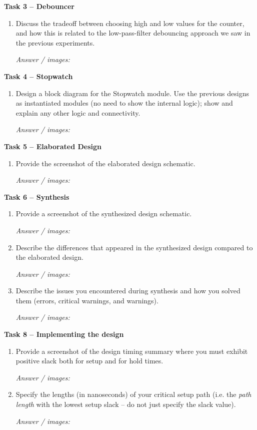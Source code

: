 \documentclass[11pt,a4paper]{article}
\newcommand{\answerspace}[1]{%
  \par\vspace{1mm}\noindent\textit{Answer / images:}\par\vspace{#1}%
}
\begin{document}
\vspace{0.8em}
\textbf{Task 3 -- Debouncer}
\begin{enumerate}[label=(\alph*),leftmargin=2.2em,topsep=2pt,start=3]
  \item Discuss the tradeoff between choosing high and low values for the counter, and how this is related to the low-pass-filter debouncing approach we saw in the previous experiments.
  \answerspace{3.5cm}
\end{enumerate}

\vspace{0.8em}
\textbf{Task 4 -- Stopwatch}
\begin{enumerate}[label=(\alph*),leftmargin=2.2em,topsep=2pt]
  \item Design a block diagram for the Stopwatch module. Use the previous designs as instantiated modules (no need to show the internal logic); show and explain any other logic and connectivity.
  \answerspace{4cm}
\end{enumerate}

\vspace{0.8em}
\textbf{Task 5 -- Elaborated Design}
\begin{enumerate}[label=(\alph*),leftmargin=2.2em,topsep=2pt,start=2]
  \item Provide the screenshot of the elaborated design schematic.
  \answerspace{4cm}
\end{enumerate}

\vspace{0.8em}
\textbf{Task 6 -- Synthesis}
\begin{enumerate}[label=(\roman*),leftmargin=2.2em,topsep=2pt]
  \item Provide a screenshot of the synthesized design schematic.
  \answerspace{4cm}
  \item Describe the differences that appeared in the synthesized design compared to the elaborated design.
  \answerspace{3cm}
  \item Describe the issues you encountered during synthesis and how you solved them (errors, critical warnings, and warnings).
  \answerspace{3cm}
\end{enumerate}

\vspace{0.8em}
\textbf{Task 8 -- Implementing the design}
\begin{enumerate}[label=(\roman*),leftmargin=2.2em,topsep=2pt]
  \item Provide a screenshot of the design timing summary where you must exhibit positive slack both for setup and for hold times.
  \answerspace{4cm}
  \item Specify the lengths (in nanoseconds) of your critical setup path (i.e. the \emph{path length} with the lowest setup slack -- do not just specify the slack value).
  \answerspace{3cm}
\end{enumerate}
\end{document}
